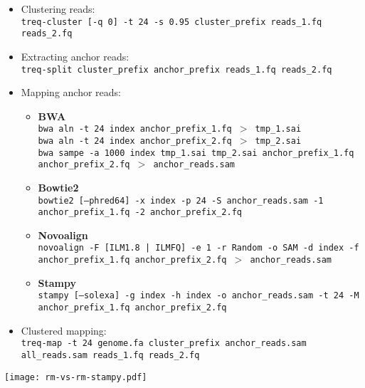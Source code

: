 \documentclass[a4paper]{article}
\begin{document}
\begin{itemize}

\item Clustering reads:\\
  {\tt treq-cluster [-q 0] -t 24 -s 0.95 cluster\_prefix reads\_1.fq reads\_2.fq}
  
\item Extracting anchor reads:\\
  {\tt treq-split cluster\_prefix anchor\_prefix reads\_1.fq reads\_2.fq}
  
\item Mapping anchor reads:\\
\begin{itemize}
 \item {\bf BWA}\\
	{\tt bwa aln -t 24 index anchor\_prefix\_1.fq $>$ tmp\_1.sai }\\
	{\tt bwa aln -t 24 index anchor\_prefix\_2.fq $>$ tmp\_2.sai }\\
	{\tt bwa sampe -a 1000 index tmp\_1.sai tmp\_2.sai anchor\_prefix\_1.fq anchor\_prefix\_2.fq $>$ anchor\_reads.sam }
 \item {\bf Bowtie2}\\
	{\tt bowtie2 [--phred64] -x index -p 24 -S anchor\_reads.sam -1 anchor\_prefix\_1.fq -2 anchor\_prefix\_2.fq }
 \item {\bf Novoalign}\\
	{\tt novoalign -F [ILM1.8 | ILMFQ] -e 1 -r Random -o SAM -d index -f anchor\_prefix\_1.fq anchor\_prefix\_2.fq $>$ anchor\_reads.sam }
 \item {\bf Stampy}\\
        {\tt stampy [--solexa] -g index -h index -o anchor\_reads.sam -t 24 -M anchor\_prefix\_1.fq anchor\_prefix\_2.fq }
\end{itemize}

\item Clustered mapping:\\
 {\tt treq-map -t 24 genome.fa cluster\_prefix anchor\_reads.sam all\_reads.sam reads\_1.fq reads\_2.fq }
\end{itemize}


\begin{figure*}
  \centering
  \texttt{[image: rm-vs-rm-stampy.pdf]} 
  \caption{ \label{fig:rm-vs-rm}
  {\bf Alternate mapping rate between readmappers compared to Stampy.} Alternate mapping rate is shown as a function of MAPQ threshold.}
\end{figure*}
\end{document}
